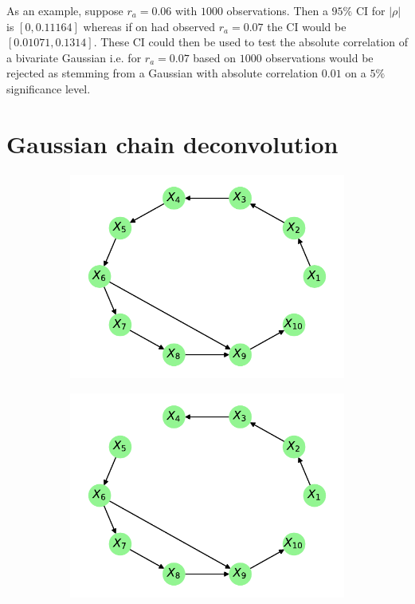\documentclass[../Thesis.tex]{subfiles}
\begin{document}
As an example, suppose $r_a=0.06$ with $1000$ observations. Then a $95\%$ CI for $|\rho|$ is $[0, 0.11164]$ whereas if on had observed $r_a = 0.07$ the CI would be $[0.01071, 0.1314]$. These CI could then be used to test the absolute correlation of a bivariate Gaussian i.e. for $r_a = 0.07$ based on $1000$ observations would be rejected as stemming from a Gaussian with absolute correlation $0.01$ on a $5\%$ significance level.


\section{Gaussian chain deconvolution}

\begin{figure}[h]
    \centering
    \begin{subfigure}[t]{0.49\textwidth}
        \centering
        \includegraphics[width=.95\linewidth]{figures/Gaussian Chain Theoretical/Chain graph from triangular G obs - MI - cutoff 2e-2.pdf}
        \caption{}
    \end{subfigure}
    \hfill
    \begin{subfigure}[t]{0.49\textwidth}
        \centering
        \includegraphics[width=.95\linewidth]{figures/Gaussian Chain Theoretical/Chain graph from triangular G obs - MI - cutoff 2_1e-2.pdf}

\end{subfigure}
\end{figure}
\end{document}
